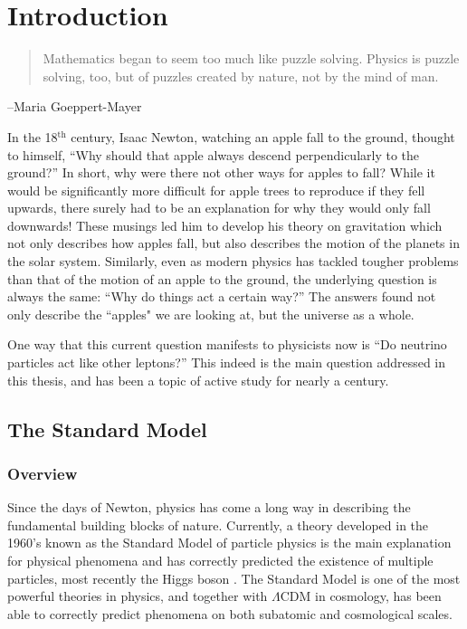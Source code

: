 \chapter{Introduction}
\begin{quote}
Mathematics began to seem too much like puzzle solving. Physics is puzzle solving, too, but of puzzles created by nature, not by the mind of man.
\end{quote}
\begin{flushright}
--Maria Goeppert-Mayer
\end{flushright}

In the 18$^\textrm{th}$ century, Isaac Newton,  watching an apple fall to the ground, thought to himself, ``Why should that apple always descend perpendicularly to the ground?''
In short, why were there not other ways for apples to fall? While it would be significantly more difficult for apple trees to reproduce if they fell upwards, there surely had to be an explanation for why they would only fall downwards!
These musings led him to develop his theory on gravitation which not only describes how apples fall, but also describes the motion of the planets in the solar system.
Similarly, even as modern physics has tackled tougher problems than that of the motion of an apple to the ground, the underlying question is always the same: ``Why do things act a certain way?''
The answers found not only describe the ``apples" we are looking at, but the universe as a whole.

One way that this current question manifests to physicists now is ``Do neutrino particles act like other leptons?''
This indeed is the main question addressed in this thesis, and has been a topic of active study for nearly a century.

\section{The Standard Model}
\subsection{Overview}
Since the days of Newton, physics has come a long way in describing the fundamental building blocks of nature.
Currently, a theory developed in the 1960's known as the Standard Model of particle physics is the main explanation for physical phenomena and has correctly predicted the existence of multiple particles, most recently the Higgs boson \cite{Aad:2012tfa}\cite{Chatrchyan:2012xdj}.
The Standard Model is one of the most powerful theories in physics, and together with $\Lambda$CDM in cosmology, has been able to correctly predict phenomena on both subatomic and cosmological scales.

